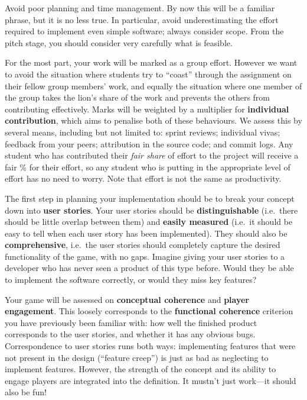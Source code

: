 \documentclass{../../fal_assignment}
\begin{document}
Avoid poor planning and time management. By now this will be a familiar phrase, but it is no less true.
In particular, avoid underestimating the effort required to implement even simple software; always consider scope.
From the pitch stage, you should consider very carefully what is feasible.

For the most part, your work will be marked as a group effort.
However we want to avoid the situation where students try to ``coast'' through the assignment
on their fellow group members' work,
and equally the situation where one member of the group takes the lion's share of the work
and prevents the others from contributing effectively.
Marks will be weighted by a multiplier for \textbf{individual contribution},
which aims to penalise both of these behaviours.
We assess this by several means, including but not limited to: sprint reviews; individual vivas; feedback from your peers;
attribution in the source code; and commit logs.
Any student who has contributed their \textit{fair share} of effort to the project will receive a fair \% for their effort,
so any student who is putting in the appropriate level of effort has no need to worry.
Note that effort is not the same as productivity.

The first step in planning your implementation should be to break your concept down into \textbf{user stories}. 
Your user stories should be \textbf{distinguishable} (i.e.\ there should be little overlap between them)
and \textbf{easily measured} (i.e.\ it should be easy to tell when each user story has been implemented).
They should also be \textbf{comprehensive}, i.e.\ the user stories should completely capture the
desired functionality of the game, with no gaps.
Imagine giving your user stories to a developer who has never seen a product of this type before.
Would they be able to implement the software correctly, or would they miss key features?

Your game will be assessed on \textbf{conceptual coherence} and \textbf{player engagement}. This loosely corresponds to the \textbf{functional coherence} criterion you have previously been familiar with:
how well the finished product corresponds to the user stories,
and whether it has any obvious bugs.
Correspondence to user stories runs both ways:
implementing features that were not present in the design (``feature creep'')
is just as bad as neglecting to implement features.
However, the strength of the concept and its ability to engage players are integrated into the definition. It mustn't just work---it should also be fun!
\end{document}
